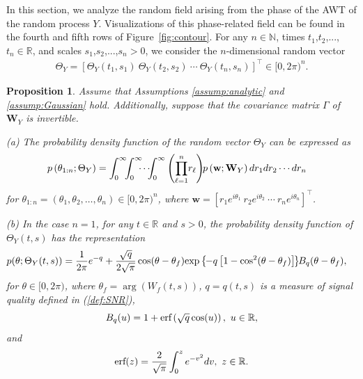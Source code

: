 \documentclass{amsart}
\newtheorem{Proposition}{Proposition}
\begin{document}
In this section, we analyze the random field arising from the phase of the AWT of the random process $Y$.
Visualizations of this phase-related field can be found in the fourth and fifth rows of Figure~\ref{fig:contour}.
For any $n\in \mathbb{N}$, times $t_{1}$,$t_{2}$,...,$t_{n}\in \mathbb{R}$, and scales $s_{1}$,$s_{2}$,...,$s_{n}>0$,
we consider the $n$-dimensional random vector
\begin{align*}%
\Theta_{Y}=\left[\Theta_{Y}(t_{1},s_{1})\ \Theta_{Y}(t_{2},s_{2})\ \cdots\ \Theta_{Y}(t_{n},s_{n})\right]^{\top}\in [0,2\pi)^{n}.
\end{align*}
\begin{Proposition}\label{prop:jpdf:Thetan}
Assume that Assumptions \ref{assump:analytic} and \ref{assump:Gaussian} hold.
Additionally,
suppose that the covariance matrix $\Gamma$ of $\mathbf{W}_{Y}$
is invertible.


(a) The probability density function of the random vector $\Theta_{Y}$
can be expressed as
\begin{align}\label{jpdf:ThetaY:n:nonnull}
&p\left(\theta_{1:n};\Theta_{Y}\right)
=\int_{0}^{\infty}\hspace{-0.15cm}\int_{0}^{\infty}\hspace{-0.2cm}\cdots \hspace{-0.15cm}\int_{0}^{\infty}\left(\overset{n}{\underset{\ell=1}{\prod}}r_{\ell}\right)
\hspace{-0.1cm} p\left(\mathbf{w};\mathbf{W}_{Y}\right)dr_{1}dr_{2}\cdots dr_{n}
\end{align}
for $\theta_{1:n}=(\theta_{1},\theta_{2},\ldots,\theta_{n})\in [0,2\pi)^{n}$,
where $\mathbf{w}=[r_{1}e^{i\theta_{1}} \  r_{2}e^{i\theta_{2}} \ \cdots \ r_{n}e^{i\theta_{n}}]^{\top}$.


(b) In the case $n=1$,
for any $t\in \mathbb{R}$ and $s>0$, the probability density function of $\Theta_{Y}(t,s)$ has the representation
\begin{align}\label{margianl_pdf_phase}
&p(\theta;\Theta_{Y}(t,s))
=\frac{1}{2\pi }e^{-q}
+
\frac{\sqrt{q}}{2\sqrt{\pi}}
\cos(\theta-\theta_{f}) \textup{exp}\left\{\hspace{-0.05cm}-q\left[1-\cos^{2}(\theta-\theta_{f})\right]\hspace{-0.05cm}\right\}
\hspace{-0.1cm}B_{q}(\theta-\theta_{f}),
\end{align}
for $\theta\in [0,2\pi)$, where
$\theta_{f}=\arg(W_{f}(t,s))$,
 $q=q(t,s)$ is a measure of signal quality defined in (\ref{def:SNR}),
\begin{equation}\label{def:B_q}
B_{q}(u)=1+\textup{erf}\left(\sqrt{q}\cos(u)\right),\ u\in \mathbb{R},
\end{equation}
and
\begin{equation*}
\textup{erf}(z) = \frac{2}{\sqrt{\pi}}\int_{0}^{z}e^{-v^{2}}dv,\ z\in \mathbb{R}.
\end{equation*}


\end{Proposition}
\end{document}
